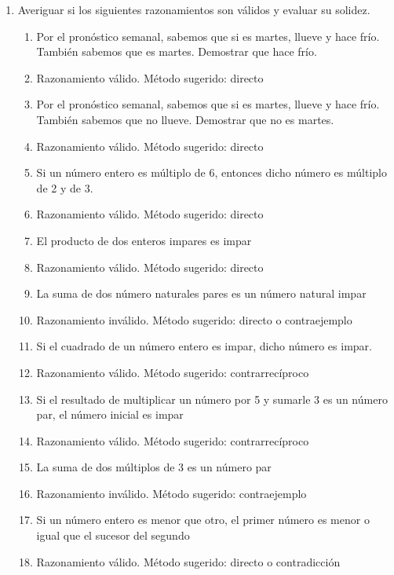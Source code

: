 \documentclass[a4paper]{article}
\newcommand{\answer}{\item[**]}
\newcommand{\exercise}{\item}
\newcommand{\then}{\to}
\newcommand{\eq}{\leftrightarrow}
\newcommand{\xor}{\veebar}
\begin{document}
\begin{enumerate}
\begin{enumerate} [label=(\alph*)]
		\item $\left(((p \xor q) \land r) \then (s \eq r) \right) \lor \left((q \then p) \then (\neg s \land t)\right)$ es F. Averiguar el valor de $p \then q$, de $r \xor s$ y de $(p \lor q) \then (\neg s \xor t)$
		\answer $p \then q$ es F, $r \xor s$ es V y $(p \lor q) \then (\neg s \xor t)$ es V. \href{https://youtu.be/-VaC5y-rrMI}{Resolución por Tu Profe en Linea}.

	\end{enumerate}

	\exercise Averiguar si los siguientes razonamientos son válidos y evaluar su solidez.
	\begin{enumerate} [label=(\alph*)]
		\item Por el pronóstico semanal, sabemos que si es martes, llueve y hace frío. También sabemos que es martes. Demostrar que hace frío.
		\answer Razonamiento válido. Método sugerido: directo

		\item Por el pronóstico semanal, sabemos que si es martes, llueve y hace frío. También sabemos que no llueve. Demostrar que no es martes.
		\answer Razonamiento válido. Método sugerido: directo

		\item Si un número entero es múltiplo de 6, entonces dicho número es múltiplo de 2 y de 3.
		\answer Razonamiento válido. Método sugerido: directo

		\item El producto de dos enteros impares es impar
		\answer Razonamiento válido. Método sugerido: directo

		\item La suma de dos número naturales pares es un número natural impar
		\answer Razonamiento inválido. Método sugerido: directo o contraejemplo

		\item Si el cuadrado de un número entero es impar, dicho número es impar. 
		\answer Razonamiento válido. Método sugerido: contrarrecíproco
		
		\item Si el resultado de multiplicar un número por 5 y sumarle 3 es un número par, el número inicial es impar
		\answer Razonamiento válido. Método sugerido: contrarrecíproco
		
		\item La suma de dos múltiplos de 3 es un número par
		\answer Razonamiento inválido. Método sugerido: contraejemplo
		
		\item Si un número entero es menor que otro, el primer número es menor o igual que el sucesor del segundo
		\answer Razonamiento válido. Método sugerido: directo o contradicción
		

\end{enumerate}
\end{enumerate}
\end{document}
